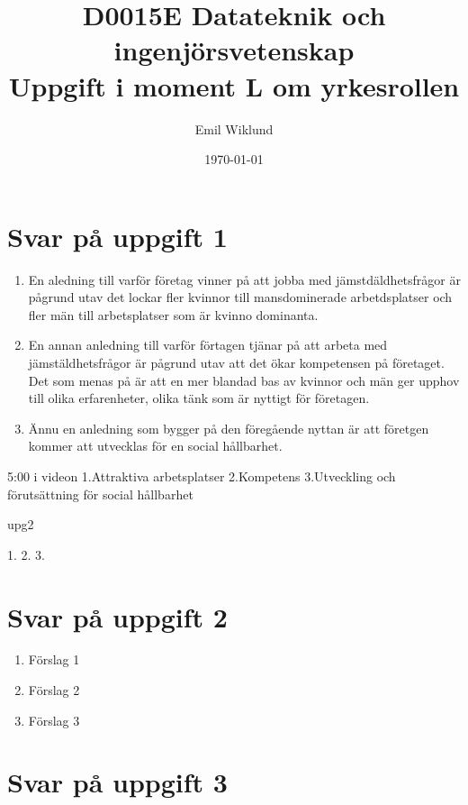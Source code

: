 \documentclass[a4paper,12pt]{article}
\title{D0015E Datateknik och ingenjörsvetenskap \\
       Uppgift i moment L om yrkesrollen}
\author{Emil Wiklund}
\date{\today}
\begin{document}
\maketitle




\section*{Svar på uppgift 1}



\begin{enumerate}
  \item En aledning till varför företag vinner på att jobba med 
  jämstdäldhetsfrågor är pågrund utav det lockar fler kvinnor 
  till mansdominerade arbetdsplatser och fler män till arbetsplatser
  som är kvinno dominanta. 
  \item En annan anledning till varför förtagen tjänar på att 
  arbeta med jämstäldhetsfrågor är pågrund utav att det ökar
  kompetensen på företaget. Det som menas på är att en mer blandad
  bas av kvinnor och män ger upphov till olika erfarenheter, olika tänk
  som är nyttigt för företagen. 
  \item Ännu en anledning som bygger på den föregående nyttan är
  att företgen kommer att utvecklas för en social hållbarhet.
\end{enumerate}

5:00 i videon
1.Attraktiva arbetsplatser
2.Kompetens
3.Utveckling och förutsättning för social hållbarhet

upg2

1.
2.
3.

\section*{Svar på uppgift 2}



\begin{enumerate}
  \item Förslag 1
  \item Förslag 2
  \item Förslag 3
\end{enumerate}
  
\section*{Svar på uppgift 3}
\end{document}
